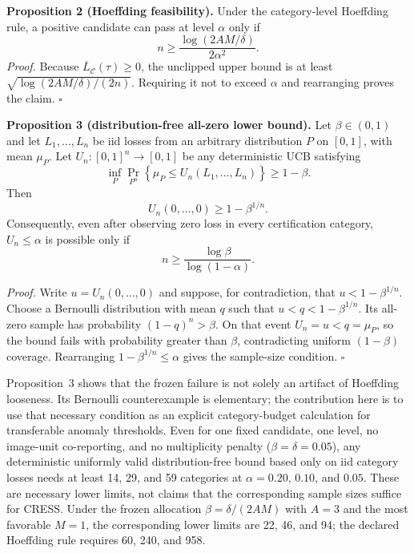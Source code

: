 \noindent\textbf{Proposition 2 (Hoeffding feasibility).} Under the category-level Hoeffding rule, a positive candidate can pass at level $\alpha$ only if
\begin{equation}\label{eq:cress-feasibility}
    n\geq\frac{\log(2AM/\delta)}{2\alpha^2}.
\end{equation}
\noindent\emph{Proof.} Because $\overline{L}_{\mathcal C}(\tau)\geq0$, the unclipped upper bound is at least $\sqrt{\log(2AM/\delta)/(2n)}$. Requiring it not to exceed $\alpha$ and rearranging proves the claim. \hfill$\square$

\noindent\textbf{Proposition 3 (distribution-free all-zero lower bound).}
Let $\beta\in(0,1)$ and let $L_1,\ldots,L_n$ be iid losses from an arbitrary distribution $P$ on $[0,1]$, with mean $\mu_P$. Let $U_n:[0,1]^n\to[0,1]$ be any deterministic UCB satisfying
\[
    \inf_{P}\Pr_{P^n}\!\left\{\mu_P\leq U_n(L_1,\ldots,L_n)\right\}\geq1-\beta.
\]
Then
\begin{equation}\label{eq:distribution-free-feasibility}
    U_n(0,\ldots,0)\geq1-\beta^{1/n}.
\end{equation}
Consequently, even after observing zero loss in every certification category, $U_n\leq\alpha$ is possible only if
\[
    n\geq\frac{\log\beta}{\log(1-\alpha)}.
\]

\noindent\emph{Proof.}
Write $u=U_n(0,\ldots,0)$ and suppose, for contradiction, that $u<1-\beta^{1/n}$. Choose a Bernoulli distribution with mean $q$ such that $u<q<1-\beta^{1/n}$. Its all-zero sample has probability $(1-q)^n>\beta$. On that event $U_n=u<q=\mu_P$, so the bound fails with probability greater than $\beta$, contradicting uniform $(1-\beta)$ coverage. Rearranging $1-\beta^{1/n}\leq\alpha$ gives the sample-size condition. \hfill$\square$

Proposition~3 shows that the frozen failure is not solely an artifact of Hoeffding looseness. Its Bernoulli counterexample is elementary; the contribution here is to use that necessary condition as an explicit category-budget calculation for transferable anomaly thresholds. Even for one fixed candidate, one level, no image-unit co-reporting, and no multiplicity penalty ($\beta=\delta=0.05$), any deterministic uniformly valid distribution-free bound based only on iid category losses needs at least 14, 29, and 59 categories at $\alpha=0.20$, $0.10$, and $0.05$. These are necessary lower limits, not claims that the corresponding sample sizes suffice for CRESS\@. Under the frozen allocation $\beta=\delta/(2AM)$ with $A=3$ and the most favorable $M=1$, the corresponding lower limits are 22, 46, and 94; the declared Hoeffding rule requires 60, 240, and 958.

